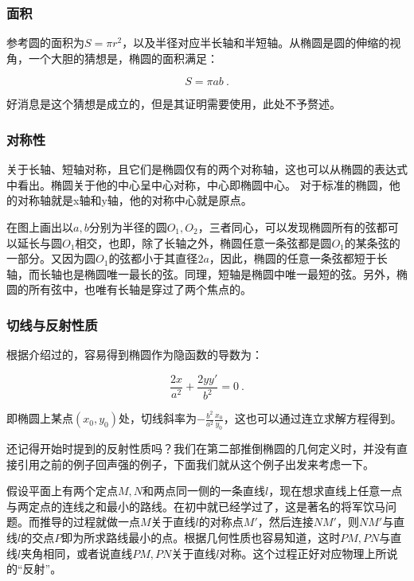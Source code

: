 \subsubsection{面积}

参考圆的面积为$S = \pi r^2$，以及半径对应半长轴和半短轴。从椭圆是圆的伸缩的视角，一个大胆的猜想是，椭圆的面积满足：

\begin{equation}
S = \pi a b~.
\end{equation}

好消息是这个猜想是成立的，但是其证明需要使用，此处不予赘述。

\subsubsection{对称性}

关于长轴、短轴对称，且它们是椭圆仅有的两个对称轴，这也可以从椭圆的表达式中看出。椭圆关于他的中心呈中心对称，中心即椭圆中心。
对于标准的椭圆，他的对称轴就是x轴和y轴，他的对称中心就是原点。

在图上画出以$a,b$分别为半径的圆$O_1,O_2$，三者同心，可以发现椭圆所有的弦都可以延长与圆$O_1$相交，也即，除了长轴之外，椭圆任意一条弦都是圆$O_1$的某条弦的一部分。又因为圆$O_1$的弦都小于其直径$2a$，因此，椭圆的任意一条弦都短于长轴，而长轴也是椭圆唯一最长的弦。同理，短轴是椭圆中唯一最短的弦。另外，椭圆的所有弦中，也唯有长轴是穿过了两个焦点的。

\subsubsection{切线与反射性质}

根据介绍过的，容易得到椭圆作为隐函数的导数为：

\begin{equation}
\frac{2x}{a^2} + \frac{2yy'}{b^2} = 0~.
\end{equation}

即椭圆上某点$(x_0,y_0)$处，切线斜率为$\displaystyle-\frac{b^2}{a^2}\frac{x_0}{y_0}$，这也可以通过连立求解方程得到。

还记得开始时提到的反射性质吗？我们在第二部推倒椭圆的几何定义时，并没有直接引用之前的例子回声强的例子，下面我们就从这个例子出发来考虑一下。

假设平面上有两个定点$M,N$和两点同一侧的一条直线$l$，现在想求直线上任意一点与两定点的连线之和最小的路线。在初中就已经学过了，这是著名的将军饮马问题。而推导的过程就做一点$M$关于直线$l$的对称点$M'$，然后连接$NM'$，则$NM'$与直线$l$的交点$P$即为所求路线最小的点。根据几何性质也容易知道，这时$PM,PN$与直线$l$夹角相同，或者说直线$PM,PN$关于直线$l$对称。这个过程正好对应物理上所说的“反射”。

